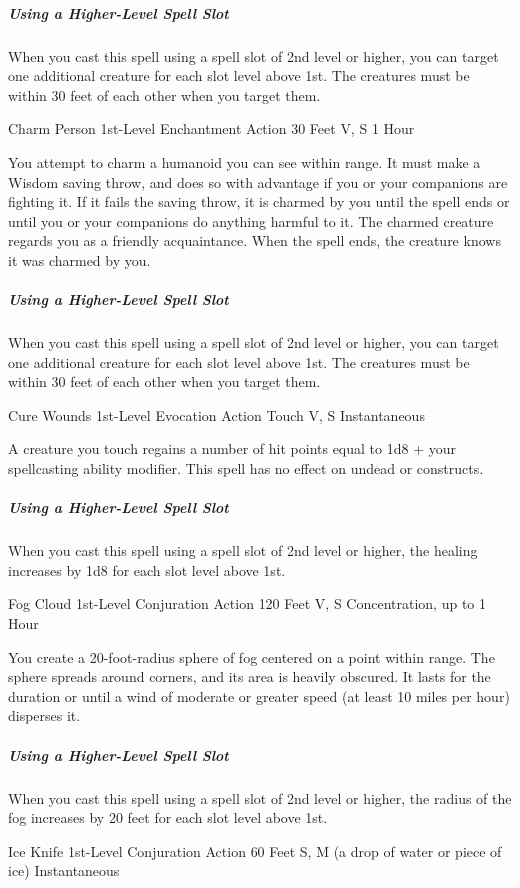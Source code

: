 \documentclass[letterpaper,openany,oneside,twocolumn]{book}
\begin{document}
\subparagraph*{Using a Higher-Level Spell Slot} When you cast this spell using a spell slot of 2nd level or higher, you can target one additional creature for each slot level above 1st. The creatures must be within 30 feet of each other when you target them.

\DndSpellHeader
  {Charm Person}
  {1st-Level Enchantment}
  {Action}
  {30 Feet}
  {V, S}
  {1 Hour}

You attempt to charm a humanoid you can see within range. It must make a Wisdom saving throw, and does so with advantage if you or your companions are fighting it. If it fails the saving throw, it is charmed by you until the spell ends or until you or your companions do anything harmful to it. The charmed creature regards you as a friendly acquaintance. When the spell ends, the creature knows it was charmed by you.

\subparagraph*{Using a Higher-Level Spell Slot} When you cast this spell using a spell slot of 2nd level or higher, you can target one additional creature for each slot level above 1st. The creatures must be within 30 feet of each other when you target them.

\DndSpellHeader
  {Cure Wounds}
  {1st-Level Evocation}
  {Action}
  {Touch}
  {V, S}
  {Instantaneous}

A creature you touch regains a number of hit points equal to 1d8 + your spellcasting ability modifier. This spell has no effect on undead or constructs.

\subparagraph*{Using a Higher-Level Spell Slot} When you cast this spell using a spell slot of 2nd level or higher, the healing increases by 1d8 for each slot level above 1st.

\DndSpellHeader
  {Fog Cloud}
  {1st-Level Conjuration}
  {Action}
  {120 Feet}
  {V, S}
  {Concentration, up to 1 Hour}

You create a 20-foot-radius sphere of fog centered on a point within range. The sphere spreads around corners, and its area is heavily obscured. It lasts for the duration or until a wind of moderate or greater speed (at least 10 miles per hour) disperses it.

\subparagraph*{Using a Higher-Level Spell Slot} When you cast this spell using a spell slot of 2nd level or higher, the radius of the fog increases by 20 feet for each slot level above 1st.

\DndSpellHeader
  {Ice Knife}
  {1st-Level Conjuration}
  {Action}
  {60 Feet}
  {S, M (a drop of water or piece of ice)}
  {Instantaneous}
\end{document}
